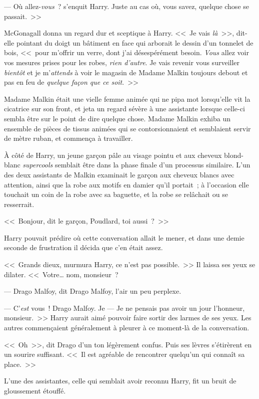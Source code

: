 --- Où allez-\emph{vous}~? s'enquit Harry. Juste au cas où, vous savez, quelque chose se passait.~>>

McGonagall donna un regard dur et sceptique à Harry. <<~Je vais \emph{là}~>>, dit-elle pointant du doigt un bâtiment en face qui arborait le dessin d'un tonnelet de bois, <<~pour m'offrir un verre, dont j'ai désespérément besoin. \emph{Vous} allez voir vos mesures prises pour les robes, \emph{rien d'autre}. Je vais revenir vous surveiller \emph{bientôt} et je m'\emph{attends} à voir le magasin de Madame Malkin toujours debout et pas en feu de \emph{quelque façon que ce soit}.~>>

Madame Malkin était une vielle femme animée qui ne pipa mot lorsqu'elle vit la cicatrice sur son front, et jeta un regard sévère à une assistante lorsque celle-ci sembla être sur le point de dire quelque chose. Madame Malkin exhiba un ensemble de pièces de tissus animées qui se contorsionnaient et semblaient servir de mètre ruban, et commença à travailler.

À côté de Harry, un jeune garçon pâle au visage pointu et aux cheveux blond-blanc \emph{supercools} semblait être dans la phase finale d'un processus similaire. L'un des deux assistants de Malkin examinait le garçon aux cheveux blancs avec attention, ainsi que la robe aux motifs en damier qu'il portait~; à l'occasion elle touchait un coin de la robe avec sa baguette, et la robe se relâchait ou se resserrait.

<<~Bonjour, dit le garçon, Poudlard, toi aussi~?~>>

Harry pouvait prédire où cette conversation allait le mener, et dans une demie seconde de frustration il décida que c'en était assez.

<<~Grands dieux, murmura Harry, ce n'est pas possible.~>> Il laissa ses yeux se dilater. <<~Votre… nom, monsieur~?

--- Drago Malfoy, dit Drago Malfoy, l'air un peu perplexe.

--- C'\emph{est} vous~! Drago Malfoy. Je — Je ne pensais pas avoir un jour l'honneur, monsieur.~>> Harry aurait aimé pouvoir faire sortir des larmes de ses yeux. Les autres commençaient généralement à pleurer à ce moment-là de la conversation.

<<~Oh~>>, dit Drago d'un ton légèrement confus. Puis ses lèvres s'étirèrent en un sourire suffisant. <<~Il est agréable de rencontrer quelqu'un qui connaît sa place.~>>

L'une des assistantes, celle qui semblait avoir reconnu Harry, fit un bruit de gloussement étouffé.

